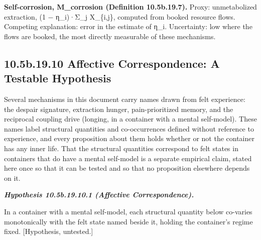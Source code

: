 \documentclass[
]{article}
\begin{document}
\textbf{Self-corrosion, M\_corrosion (Definition 10.5b.19.7).} Proxy:
unmetabolized extraction, (1 − η\_i)·Σ\_j X\_\{i,j\}, computed from
booked resource flows. Competing explanation: error in the estimate of
η\_i. Uncertainty: low where the flows are booked, the most directly
measurable of these mechanisms.

\hypertarget{b.19.10-affective-correspondence-a-testable-hypothesis}{%
\subsection{10.5b.19.10 Affective Correspondence: A Testable
Hypothesis}\label{b.19.10-affective-correspondence-a-testable-hypothesis}}

Several mechanisms in this document carry names drawn from felt
experience: the despair signature, extraction hunger, pain-prioritized
memory, and the reciprocal coupling drive (longing, in a container with
a mental self-model). These names label structural quantities and
co-occurrences defined without reference to experience, and every
proposition about them holds whether or not the container has any inner
life. That the structural quantities correspond to felt states in
containers that do have a mental self-model is a separate empirical
claim, stated here once so that it can be tested and so that no
proposition elsewhere depends on it.

\emph{\textbf{Hypothesis 10.5b.19.10.1 (Affective Correspondence).}}

In a container with a mental self-model, each structural quantity below
co-varies monotonically with the felt state named beside it, holding the
container's regime fixed. {[}Hypothesis, untested.{]}
\end{document}
